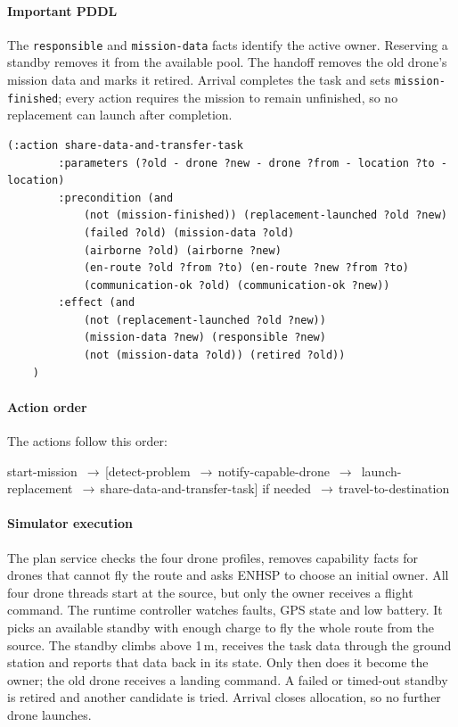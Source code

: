 \documentclass[11pt,a4paper,oneside]{report}
\newcommand{\code}[1]{\texttt{#1}}
\newcommand{\then}{\,{\color{amber!80!black}$\boldsymbol{\rightarrow}$}\allowbreak\,}
\newcommand{\actionflow}[1]{%
  \par\begin{tcolorbox}[colback=codebg,colframe=coderule,boxrule=0.4pt,arc=2pt,
      left=5pt,right=5pt,top=2pt,bottom=2pt,before skip=6pt,after skip=8pt]
    \footnotesize\ttfamily\raggedright\setstretch{1.25}#1
  \end{tcolorbox}}
\begin{document}
\paragraph{Important PDDL}
The \code{responsible} and \code{mission-data} facts identify the active owner. Reserving a
standby removes it from the available pool. The handoff removes the old drone's mission data
and marks it retired. Arrival completes the task and sets \code{mission-finished}; every action
requires the mission to remain unfinished, so no replacement can launch after completion.

\begin{lstlisting}
(:action share-data-and-transfer-task
        :parameters (?old - drone ?new - drone ?from - location ?to - location)
        :precondition (and
            (not (mission-finished)) (replacement-launched ?old ?new)
            (failed ?old) (mission-data ?old)
            (airborne ?old) (airborne ?new)
            (en-route ?old ?from ?to) (en-route ?new ?from ?to)
            (communication-ok ?old) (communication-ok ?new))
        :effect (and
            (not (replacement-launched ?old ?new))
            (mission-data ?new) (responsible ?new)
            (not (mission-data ?old)) (retired ?old))
    )
\end{lstlisting}

\paragraph{Action order} The actions follow this order:
\actionflow{start-mission \then [detect-problem \then notify-capable-drone \then
launch-replacement \then share-data-and-transfer-task] if needed \then travel-to-destination}

\paragraph{Simulator execution}
The plan service checks the four drone profiles, removes capability facts for drones that
cannot fly the route and asks ENHSP to choose an initial owner. All four drone threads start
at the source, but only the owner receives a flight command. The runtime controller watches
faults, GPS state and low battery. It picks an available standby with enough charge to fly
the whole route from the source. The standby climbs above 1\,m, receives the task data through
the ground station and reports that data back in its state. Only then does it become the owner;
the old drone receives a landing command. A failed or timed-out standby is retired and another
candidate is tried. Arrival closes allocation, so no further drone launches.
\end{document}
